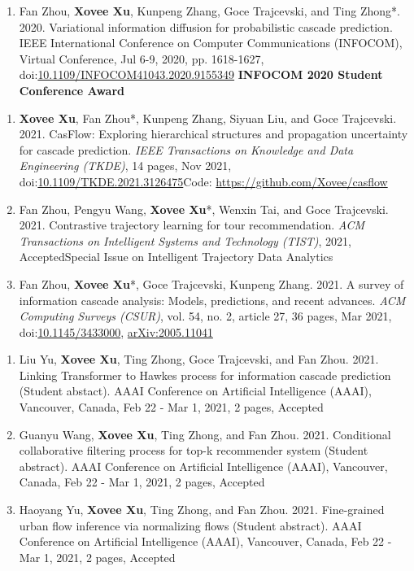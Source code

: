 \begin{enumerate}[resume]
    \item Fan Zhou, \textbf{Xovee Xu}, Kunpeng Zhang, Goce Trajcevski, and Ting Zhong*. 2020. Variational information diffusion for probabilistic cascade prediction. IEEE International Conference on Computer Communications (INFOCOM), Virtual Conference, Jul 6-9, 2020, pp. 1618-1627, doi:\href{https://doi.org/10.1109/INFOCOM41043.2020.9155349}{10.1109/INFOCOM41043.2020.9155349}
    \newline \textbf{\color{red}INFOCOM 2020 Student Conference Award}
\end{enumerate}


\begin{enumerate}[resume]
    \item \textbf{Xovee Xu}, Fan Zhou*, Kunpeng Zhang, Siyuan Liu, and Goce Trajcevski. 2021. CasFlow: Exploring hierarchical structures and propagation uncertainty for cascade prediction. \textit{IEEE Transactions on Knowledge and Data Engineering (TKDE)}, 14 pages, Nov 2021, doi:\href{https://doi.org/10.1109/TKDE.2021.3126475}{10.1109/TKDE.2021.3126475}\newline Code: {\color{gray}\url{https://github.com/Xovee/casflow}}
    \item Fan Zhou, Pengyu Wang, \textbf{Xovee Xu}*, Wenxin Tai, and Goce Trajcevski. 2021. Contrastive trajectory learning for tour recommendation. \textit{ACM Transactions on Intelligent Systems and Technology (TIST)}, 2021, Accepted\newline Special Issue on Intelligent Trajectory Data Analytics
    \item Fan Zhou, \textbf{Xovee Xu}*, Goce Trajcevski, Kunpeng Zhang. 2021. A survey of information cascade analysis: Models, predictions, and recent advances. \textit{ACM Computing Surveys (CSUR)}, vol. 54, no. 2, article 27, 36 pages, Mar 2021, doi:\href{https://xovee.cn/html/paper-redirects/csur2021.html}{10.1145/3433000}, \href{https://arxiv.org/abs/2005.11041}{arXiv:2005.11041}
\end{enumerate}


\begin{enumerate}[resume]
    \item Liu Yu, \textbf{Xovee Xu}, Ting Zhong, Goce Trajcevski, and Fan Zhou. 2021. Linking Transformer to Hawkes process for information cascade prediction (Student abstact). AAAI Conference on Artificial Intelligence (AAAI), Vancouver, Canada, Feb 22 - Mar 1, 2021, 2 pages, Accepted
    \item Guanyu Wang, \textbf{Xovee Xu}, Ting Zhong, and Fan Zhou. 2021. Conditional collaborative filtering process for top-k recommender system (Student abstract). AAAI Conference on Artificial Intelligence (AAAI), Vancouver, Canada, Feb 22 - Mar 1, 2021, 2 pages, Accepted
    \item Haoyang Yu, \textbf{Xovee Xu}, Ting Zhong, and Fan Zhou. 2021. Fine-grained urban flow inference via normalizing flows (Student abstract). AAAI Conference on Artificial Intelligence (AAAI), Vancouver, Canada, Feb 22 - Mar 1, 2021, 2 pages, Accepted
\end{enumerate}

